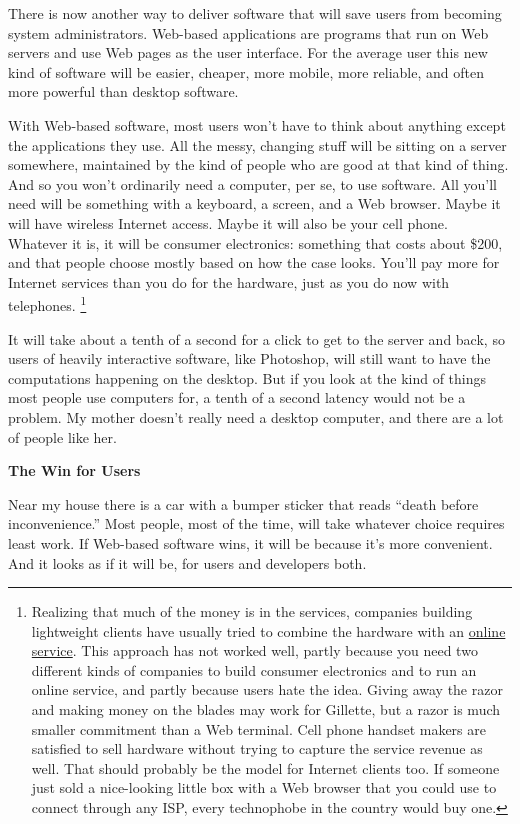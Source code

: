 \documentclass[12pt]{book}
\begin{document}
There is now another way to deliver software that will save users from
becoming system administrators. Web-based applications are programs that
run on Web servers and use Web pages as the user interface. For the
average user this new kind of software will be easier, cheaper, more
mobile, more reliable, and often more powerful than desktop software.

With Web-based software, most users won't have to think about anything
except the applications they use. All the messy, changing stuff will be
sitting on a server somewhere, maintained by the kind of people who are
good at that kind of thing. And so you won't ordinarily need a computer,
per se, to use software. All you'll need will be something with a
keyboard, a screen, and a Web browser. Maybe it will have wireless
Internet access. Maybe it will also be your cell phone. Whatever it is,
it will be consumer electronics: something that costs about \$200, and
that people choose mostly based on how the case looks. You'll pay more
for Internet services than you do for the hardware, just as you do now
with telephones. \footnote{Realizing that much of the money is in the services, companies
building lightweight clients have usually tried to combine the hardware
with an \href{http://news.cnet.com/news/0-1006-200-3622600.html}{online
service}. This approach has not worked well, partly because you need two
different kinds of companies to build consumer electronics and to run an
online service, and partly because users hate the idea. Giving away the
razor and making money on the blades may work for Gillette, but a razor
is much smaller commitment than a Web terminal. Cell phone handset
makers are satisfied to sell hardware without trying to capture the
service revenue as well. That should probably be the model for Internet
clients too. If someone just sold a nice-looking little box with a Web
browser that you could use to connect through any ISP, every technophobe
in the country would buy one.}

It will take about a tenth of a second for a click to get to the server
and back, so users of heavily interactive software, like Photoshop, will
still want to have the computations happening on the desktop. But if you
look at the kind of things most people use computers for, a tenth of a
second latency would not be a problem. My mother doesn't really need a
desktop computer, and there are a lot of people like her.

\textbf{The Win for Users}

Near my house there is a car with a bumper sticker that reads ``death
before inconvenience.'' Most people, most of the time, will take
whatever choice requires least work. If Web-based software wins, it will
be because it's more convenient. And it looks as if it will be, for
users and developers both.
\end{document}
